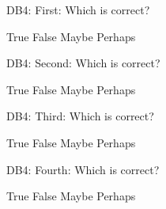 %
%


\begin{rtVW}
\begin{problem}[5]
DB4: First: Which is correct?
\begin{answers}{4}
\bChoices[nCols=2,random]
     True\eAns
     False\eAns
     Maybe\eAns
     Perhaps\eAns
\eChoices
\end{answers}
\end{problem}
\end{rtVW}

\begin{rtVW}
\begin{problem}[5]
DB4: Second: Which is correct?
\begin{answers}{4}
\bChoices[nCols=2,random]
     True\eAns
     False\eAns
     Maybe\eAns
     Perhaps\eAns
\eChoices
\end{answers}
\end{problem}
\end{rtVW}

\begin{rtVW}
\begin{problem}[5]
DB4: Third: Which is correct?
\begin{answers}{4}
\bChoices[nCols=2,random]
     True\eAns
     False\eAns
     Maybe\eAns
     Perhaps\eAns
\eChoices
\end{answers}
\end{problem}
\end{rtVW}

\begin{rtVW}
\begin{problem}[5]
DB4: Fourth: Which is correct?
\begin{answers}{4}
\bChoices[nCols=2,random]
     True\eAns
     False\eAns
     Maybe\eAns
     Perhaps\eAns
\eChoices
\end{answers}
\end{problem}
\end{rtVW}

\eRTVToks

\endinput